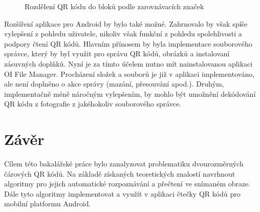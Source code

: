   \begin{figure}[H]
  \begin{center}
    \caption{Rozdělení QR kódu do bloků podle zarovnávacích značek}
    \label{alignmentBlocks}
  \end{center}
\end{figure}
 
Rozšíření aplikace pro Android by bylo také možné. Zahrnovalo by však spíše
vylepšení z pohledu uživatele, nikoliv však funkční z pohledu spolehlivosti 
a podpory čtení QR kódů. Hlavním přínosem by byla implementace souborového
správce, který by byl využit pro správu QR kódů, obrázků a instalovaní zásuvných
doplňků. Nyní je za tímto účelem nutno mít nainstalovanou aplikaci OI File
Manager. Procházení složek a souborů je již v aplikaci implementováno, ale není
doplněno o akce správy (mazání, přesouvání apod.). Druhým, implementačně méně
náročným vylepšením, by mohlo být umožnění dekódování QR kódu z fotografie z
jakéhokoliv souborového správce.

\chapter{Závěr}

Cílem této bakalářské práce bylo zanalyzovat problematiku dvourozměrných
čárových QR kódů. Na základě získaných teoretických znalostí navrhnout algoritmy pro
jejich automatické rozpoznávání a přečtení ve snímaném obraze. Dále tyto algoritmy
implementovat a využít v aplikaci čtečky QR kódů pro mobilní platformu Android.

